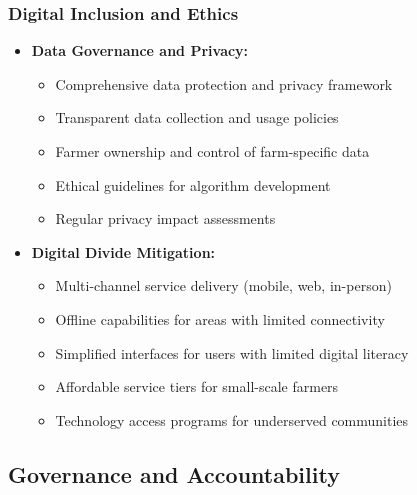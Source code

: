 \subsubsection{Digital Inclusion and Ethics}
\begin{itemize}
    \item \textbf{Data Governance and Privacy:}
    \begin{itemize}
        \item Comprehensive data protection and privacy framework
        \item Transparent data collection and usage policies
        \item Farmer ownership and control of farm-specific data
        \item Ethical guidelines for algorithm development
        \item Regular privacy impact assessments
    \end{itemize}
    
    \item \textbf{Digital Divide Mitigation:}
    \begin{itemize}
        \item Multi-channel service delivery (mobile, web, in-person)
        \item Offline capabilities for areas with limited connectivity
        \item Simplified interfaces for users with limited digital literacy
        \item Affordable service tiers for small-scale farmers
        \item Technology access programs for underserved communities
    \end{itemize}
\end{itemize}

\subsection{Governance and Accountability}

